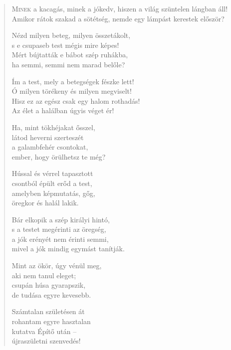 
\begin{verse}

{\par%
\lettrine{M}{inek} {\LettrineTextFont a kacagás, minek a jókedv,}\newline
hiszen a világ szüntelen lángban áll!\newline
Amikor rátok szakad a sötétség,\verselinebreak
nemde egy lámpást kerestek először?
\par}

 Nézd milyen beteg, milyen összetákolt,\\
s e csupaseb test mégis mire képes!\\
Mért bújtatták e bábot szép ruhákba,\\
ha semmi, semmi nem marad belőle?

 Ím a test, mely a betegségek fészke lett!\\
Ó milyen törékeny és milyen megviselt!\\
Hisz ez az egész csak egy halom rothadás!\\
Az élet a halálban úgyis véget ér!

 Ha, mint tökhéjakat ősszel,\\
látod heverni szerteszét\\
a galambfehér csontokat,\\
ember, hogy örülhetsz te még?

 Hússal és vérrel tapasztott\\
csontból épült erőd a test,\\
amelyben képmutatás, gőg,\\
öregkor és halál lakik.

 Bár elkopik a szép királyi hintó,\\
s a testet megérinti az öregség,\\
a jók erényét nem érinti semmi,\\
mivel a jók mindig egymást tanítják.

 Mint az ökör, úgy vénül meg,\\
aki nem tanul eleget;\\
csupán húsa gyarapszik,\\
de tudása egyre kevesebb.

 Számtalan születésen át\\
rohantam egyre hasztalan\\
kutatva Építő után –\\
újraszületni szenvedés!


\end{verse}
